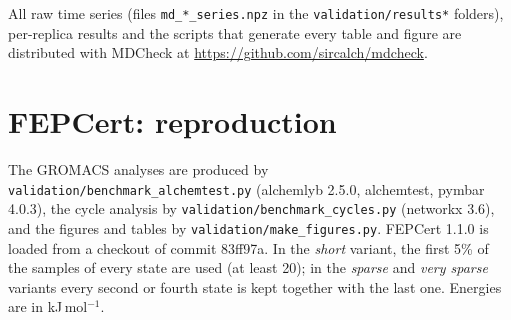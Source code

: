 \documentclass[11pt]{article}
\begin{document}
\begin{table}[h]
\centering\small
\caption{Reference means from the long runs; the standard error is from the spread of the run means.}
\end{table}

All raw time series (files \texttt{md\_*\_series.npz} in the \texttt{validation/results*} folders), per-replica results and the scripts that generate every table and figure are distributed with MDCheck at \url{https://github.com/sircalch/mdcheck}.

\section{FEPCert: reproduction}
The GROMACS analyses are produced by \texttt{validation/benchmark\_alchemtest.py} (alchemlyb 2.5.0, alchemtest, pymbar 4.0.3), the cycle analysis by \texttt{validation/benchmark\_cycles.py} (networkx 3.6), and the figures and tables by \texttt{validation/make\_figures.py}. FEPCert 1.1.0 is loaded from a checkout of commit 83ff97a. In the \textit{short} variant, the first 5\% of the samples of every state are used (at least 20); in the \textit{sparse} and \textit{very sparse} variants every second or fourth state is kept together with the last one. Energies are in kJ\,mol$^{-1}$.
\end{document}
